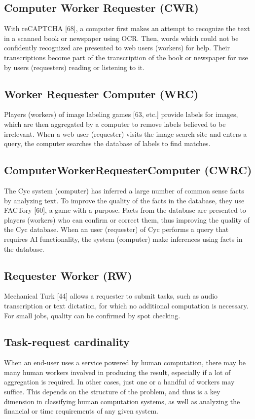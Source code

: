 \documentclass{sig-alternate}
\begin{document}
\subsection*{Computer  Worker Requester (CWR)}
With reCAPTCHA [68], a computer first makes an attempt to recognize the text in a scanned book or newspaper using OCR. Then, words which could not be confidently recognized are presented to web users (workers) for help. Their transcriptions become part of the transcription of the book or newspaper for use by users (requesters) reading or listening to it.
\subsection*{Worker  Requester  Computer (WRC)}
Players (workers) of image labeling games [63, etc.] provide labels for images, which are then aggregated by a computer to remove labels believed to be irrelevant. When a web user (requester) visits the image search site and enters a query, the computer searches the database of labels to find matches.
\subsection*{ComputerWorkerRequesterComputer (CWRC)}
The Cyc system (computer) has inferred a large number of common sense facts by analyzing text. To improve the quality of the facts in the database, they use FACTory [60], a game with a purpose. Facts from the database are presented to players (workers) who can confirm or correct them, thus improving the quality of the Cyc database. When an user (requester) of Cyc performs a query that requires AI functionality, the system (computer) make inferences using facts in the database.
\subsection*{Requester  Worker (RW)}
Mechanical Turk [44] allows a requester to submit tasks, such as audio transcription or text dictation, for which no additional computation is necessary. For small jobs, quality can be confirmed by spot checking.
\subsection*{Task-request cardinality}
When an end-user uses a service powered by human computation, there may be many human workers involved in producing the result, especially if a lot of aggregation is required. In other cases, just one or a handful of workers may suffice. This depends on the structure of the problem, and thus is a key dimension in classifying human computation systems, as well as analyzing the financial or time requirements of any given system.
\end{document}
